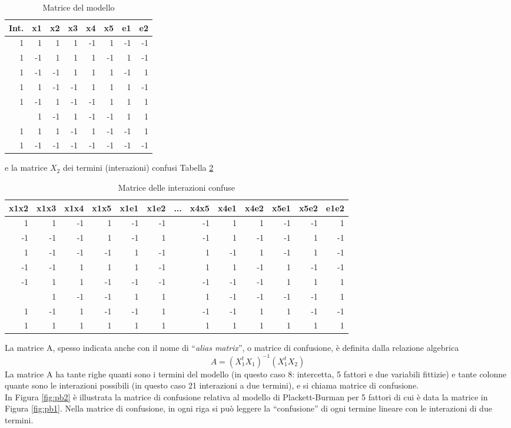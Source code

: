 \documentclass[
  11pt,
]{book}
\begin{document}
\begin{table}

\caption{\label{tab:matrmod}Matrice del modello}
\centering
\begin{tabular}[t]{rrrrrrrr}
\toprule
Int. & x1 & x2 & x3 & x4 & x5 & e1 & e2\\
\midrule
1 & 1 & 1 & 1 & -1 & 1 & -1 & -1\\
1 & -1 & 1 & 1 & 1 & -1 & 1 & -1\\
1 & -1 & -1 & 1 & 1 & 1 & -1 & 1\\
1 & 1 & -1 & -1 & 1 & 1 & 1 & -1\\
1 & -1 & 1 & -1 & -1 & 1 & 1 & 1\\
\addlinespace
1 & 1 & -1 & 1 & -1 & -1 & 1 & 1\\
1 & 1 & 1 & -1 & 1 & -1 & -1 & 1\\
1 & -1 & -1 & -1 & -1 & -1 & -1 & -1\\
\bottomrule
\end{tabular}
\end{table}

e la matrice \(X_2\) dei termini (interazioni) confusi Tabella \ref{tab:pbmatrconf}

\begin{table}

\caption{\label{tab:pbmatrconf}Matrice delle interazioni confuse}
\centering
\begin{tabular}[t]{rrrrrrlrrrrrr}
\toprule
x1x2 & x1x3 & x1x4 & x1x5 & x1e1 & x1e2 & ... & x4x5 & x4e1 & x4e2 & x5e1 & x5e2 & e1e2\\
\midrule
1 & 1 & -1 & 1 & -1 & -1 &  & -1 & 1 & 1 & -1 & -1 & 1\\
-1 & -1 & -1 & 1 & -1 & 1 &  & -1 & 1 & -1 & -1 & 1 & -1\\
1 & -1 & -1 & -1 & 1 & -1 &  & 1 & -1 & 1 & -1 & 1 & -1\\
-1 & -1 & 1 & 1 & 1 & -1 &  & 1 & 1 & -1 & 1 & -1 & -1\\
-1 & 1 & 1 & -1 & -1 & -1 &  & -1 & -1 & -1 & 1 & 1 & 1\\
\addlinespace
-1 & 1 & -1 & -1 & 1 & 1 &  & 1 & -1 & -1 & -1 & -1 & 1\\
1 & -1 & 1 & -1 & -1 & 1 &  & -1 & -1 & 1 & 1 & -1 & -1\\
1 & 1 & 1 & 1 & 1 & 1 &  & 1 & 1 & 1 & 1 & 1 & 1\\
\bottomrule
\end{tabular}
\end{table}

La matrice A, spesso indicata anche con il nome di ``\emph{alias matrix}'', o matrice di confusione, è definita dalla relazione algebrica
\[
A=(X_1^tX_1)^{-1}(X_1^tX_2)
\]
La matrice A ha tante righe quanti sono i termini del modello (in questo caso 8: intercetta, 5 fattori e due variabili fittizie) e tante colonne quante sono le interazioni possibili (in questo caso 21 interazioni a due termini), e si chiama matrice di confusione.\\
In Figura \ref{fig:pb2} è illustrata la matrice di confusione relativa al modello di Plackett-Burman per 5 fattori di cui è data la matrice in Figura \ref{fig:pb1}. Nella matrice di confusione, in ogni riga si può leggere la ``confusione'' di ogni termine lineare con le interazioni di due termini.
\end{document}
